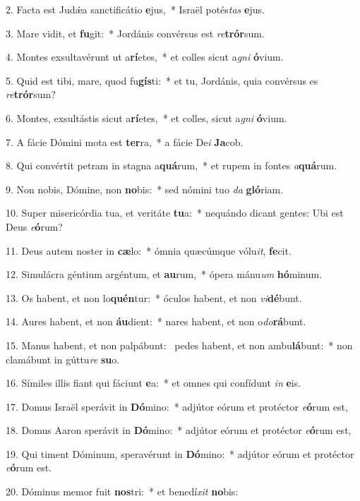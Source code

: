 2. Facta est Judǽa sanctificátio \textbf{e}jus,~*  Israël potés\textit{tas} \textbf{e}jus.\

3. Mare vidit, et \textbf{fu}git:~*  Jordánis convérsus est \textit{re}\textbf{trór}sum.\

4. Montes exsultavérunt ut a\textbf{rí}etes,~*  et colles sicut a\textit{gni} \textbf{ó}vium.\

5. Quid est tibi, mare, quod fu\textbf{gís}ti:~*  et tu, Jordánis, quia convérsus es \textit{re}\textbf{trór}sum?\

6. Montes, exsultástis sicut a\textbf{rí}etes,~*  et colles, sicut a\textit{gni} \textbf{ó}vium.\

7. A fácie Dómini mota est \textbf{ter}ra,~*  a fácie De\textit{i} \textbf{Ja}cob.\

8. Qui convértit petram in stagna a\textbf{quá}rum,~*  et rupem in fontes \textit{a}\textbf{quá}rum.\

9. Non nobis, Dómine, non \textbf{no}bis:~*  sed nómini tuo \textit{da} \textbf{gló}riam.\

10. Super misericórdia tua, et veritáte \textbf{tu}a:~*  nequándo dicant gentes: Ubi est Deus \textit{e}\textbf{ó}rum?\

11. Deus autem noster in \textbf{cæ}lo:~*  ómnia quæcúmque vólu\textit{it}, \textbf{fe}cit.\

12. Simulácra géntium argéntum, et \textbf{au}rum,~*  ópera mánu\textit{um} \textbf{hó}minum.\

13. Os habent, et non lo\textbf{quén}tur:~*  óculos habent, et non \textit{vi}\textbf{dé}bunt.\

14. Aures habent, et non \textbf{áu}dient:~*  nares habent, et non o\textit{do}\textbf{rá}bunt.\

15. Manus habent, et non palpábunt: \dag\  pedes habent, et non ambu\textbf{lá}bunt:~*  non clamábunt in gúttu\textit{re} \textbf{su}o.\

16. Símiles illis fiant qui fáciunt \textbf{e}a:~*  et omnes qui confídunt \textit{in} \textbf{e}is.\

17. Domus Israël sperávit in \textbf{Dó}mino:~*  adjútor eórum et protéctor \textit{e}\textbf{ó}rum est,\

18. Domus Aaron sperávit in \textbf{Dó}mino:~*  adjútor eórum et protéctor \textit{e}\textbf{ó}rum est,\

19. Qui timent Dóminum, speravérunt in \textbf{Dó}mino:~*  adjútor eórum et protéctor \textit{e}\textbf{ó}rum est.\

20. Dóminus memor fuit \textbf{nos}tri:~*  et benedí\textit{xit} \textbf{no}bis:\

